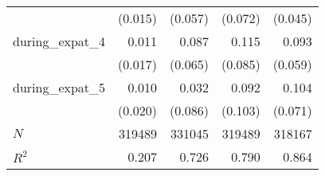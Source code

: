 {\begin{tabular}{l*{4}{D{.}{.}{-1}}}
            &     (0.015)         &     (0.057)         &     (0.072)         &     (0.045)         \\
[1em]
during\_expat\_4&       0.011         &       0.087         &       0.115         &       0.093         \\
            &     (0.017)         &     (0.065)         &     (0.085)         &     (0.059)         \\
[1em]
during\_expat\_5&       0.010         &       0.032         &       0.092         &       0.104         \\
            &     (0.020)         &     (0.086)         &     (0.103)         &     (0.071)         \\
\hline
\(N\)       &      319489         &      331045         &      319489         &      318167         \\
\(R^{2}\)   &       0.207         &       0.726         &       0.790         &       0.864         \\
\hline\hline
\end{tabular}
}
